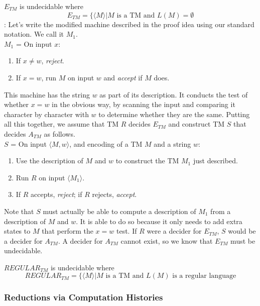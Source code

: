 \documentclass{article}
\begin{document}
\begin{theorem}
  $E_{TM}$ is undecidable where $$E_{TM} = \{ \langle M \rangle | M \textrm{ is a TM and } L(M) = \emptyset$$ 
  : Let's write the modified machine described in the proof idea using our standard notation. We call it $M_1$. \\ 
  $M_1$ = On input $x$: 
  \begin{enumerate}
    \item If $x \neq w$, \emph{reject}. 
    \item If $x = w$, run $M$ on input $w$ and \emph{accept} if $M$ does. 
  \end{enumerate}
  This machine has the string $w$ as part of its description. It conducts the test of whether $x=w$ in the obvious way, by scanning the input and comparing it character by character with $w$ to determine whether they are the same. Putting all this together, we assume that TM $R$ decides $E_{TM}$ and construct TM $S$ that decides $A_{TM}$ as follows. \\
  $S$ = On input $\langle M,w \rangle$, and encoding of a TM $M$ and a string $w$: 
  \begin{enumerate}
    \item Use the description of $M$ and $w$ to construct the TM $M_1$ just described. 
    \item Run $R$ on input $\langle M_1 \rangle$. 
    \item If $R$ accepts, \emph{reject}; if $R$ rejects, \emph{accept}. 
  \end{enumerate}
  Note that $S$ must actually be able to compute a description of $M_1$ from a description of $M$ and $w$. It is able to do so because it only needs to add extra states to $M$ that perform the $x=w$ test. If $R$ were a decider for $E_{TM}$, $S$ would be a decider for $A_{TM}$. A decider for $A_{TM}$ cannot exist, so we know that $E_{TM}$ must be undecidable. 
\end{theorem}

\begin{theorem}
  $REGULAR_{TM}$ is undecidable where $$REGULAR_{TM} = \{ \langle M \rangle | M \textrm{ is a TM and } L(M) \textrm{ is a regular language}$$ 
\end{theorem}

\subsubsection{Reductions via Computation Histories}
\end{document}
